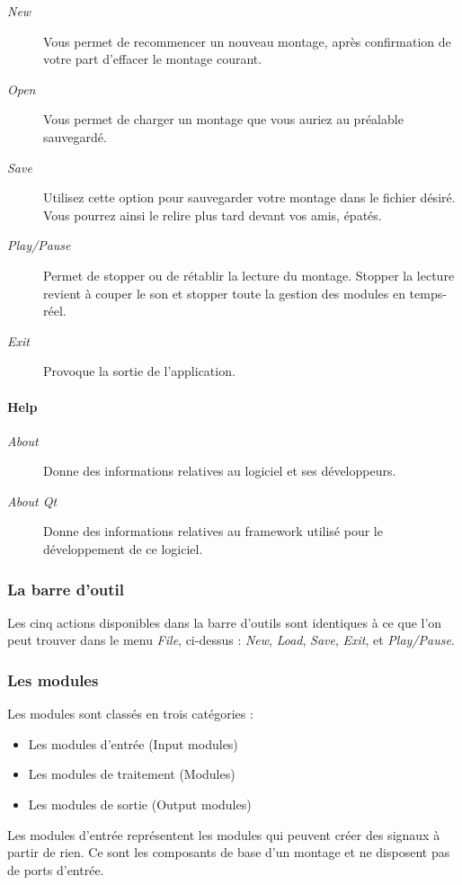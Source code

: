 \documentclass[a4paper,oneside,frenchb,12pt]{article}
\begin{document}
\begin{description}
\item[\emph{New}]
  Vous permet de recommencer un nouveau montage, après
  confirmation de votre part d'effacer le montage courant.
\item[\emph{Open}]
  Vous permet de charger un montage que vous auriez au préalable
  sauvegardé.
\item[\emph{Save}]
  Utilisez cette option pour sauvegarder votre montage dans le
  fichier désiré. Vous pourrez ainsi le relire plus tard devant vos
  amis, épatés.
\item[\emph{Play/Pause}]
  Permet de stopper ou de rétablir la lecture du montage.
  Stopper la lecture revient à couper le son et stopper toute la gestion
  des modules en temps-réel.
\item[\emph{Exit}]
  Provoque la sortie de l'application.
\end{description}

\paragraph{Help}

\begin{description}
\item[\emph{About}]
  Donne des informations relatives au logiciel et ses
  développeurs.
\item[\emph{About Qt}]
  Donne des informations relatives au framework utilisé pour
  le développement de ce logiciel.
\end{description}
\subsubsection{La barre d'outil}

Les cinq actions disponibles dans la barre d'outils sont identiques à ce
que l'on peut trouver dans le menu \emph{File}, ci-dessus : \emph{New}, \emph{Load}, \emph{Save},
\emph{Exit}, et \emph{Play/Pause}.

\subsubsection{Les modules}

Les modules sont classés en trois catégories :

\begin{itemize}
\item
  Les modules d'entrée (Input modules)
\item
  Les modules de traitement (Modules)
\item
  Les modules de sortie (Output modules)
\end{itemize}
Les modules d'entrée représentent les modules qui peuvent créer des
signaux à partir de rien. Ce sont les composants de base d'un montage et
ne disposent pas de ports d'entrée.
\end{document}
